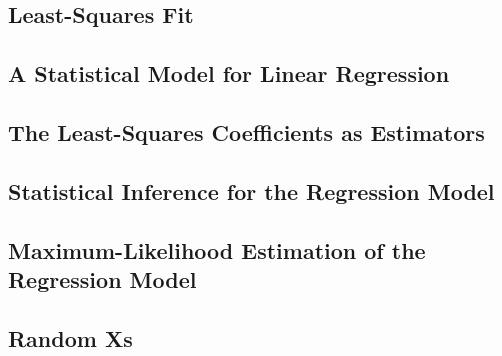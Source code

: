 \documentclass[a4paper,11pt]{article}
\begin{document}
\subsection{Least-Squares Fit}
\subsection{A Statistical Model for Linear Regression}
\subsection{The Least-Squares Coefficients as Estimators}
\subsection{Statistical Inference for the Regression Model}
\subsection{Maximum-Likelihood Estimation of the Regression Model}
\subsection{Random Xs}
\end{document}
